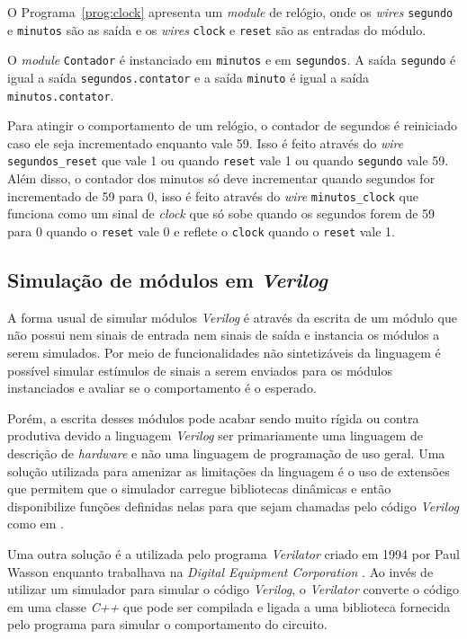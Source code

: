 O Programa~\ref{prog:clock} apresenta um \emph{module} de relógio,
onde os \emph{wires} \texttt{segundo} e \texttt{minutos} são as 
saída e os \emph{wires} \texttt{clock} e \texttt{reset} são as entradas 
do módulo.

O \emph{module} \texttt{Contador} é instanciado em \texttt{minutos}
e em \texttt{segundos}. A saída \texttt{segundo} é igual a saída 
\texttt{segundos.contator} e a saída \texttt{minuto} é igual a saída 
\texttt{minutos.contator}.

Para atingir o comportamento de um relógio, o contador de segundos é
reiniciado caso ele seja incrementado enquanto vale 59. Isso é feito
através do \emph{wire} \texttt{segundos\_reset} que vale 1 ou quando
\texttt{reset} vale 1 ou quando \texttt{segundo} vale 59.
Além disso, o contador dos minutos só deve incrementar quando segundos
for incrementado de 59 para 0, isso é feito através do \emph{wire}
\texttt{minutos\_clock} que funciona como um sinal de \emph{clock} que só
sobe quando os segundos forem de 59 para 0 quando o \texttt{reset} vale 0
e reflete o \texttt{clock} quando o \texttt{reset} vale 1.

\subsection{Simulação de módulos em \emph{Verilog}}
\label{sec:vesim}

A forma usual de simular módulos \emph{Verilog} é através
da escrita de um módulo que não possui nem sinais de entrada
nem sinais de saída e instancia os módulos a serem simulados. Por meio
de funcionalidades não sintetizáveis da linguagem é possível
simular estímulos de sinais a serem enviados para os módulos 
instanciados e avaliar se o comportamento é o esperado.

Porém, a escrita desses módulos pode acabar sendo muito 
rígida ou contra produtiva devido a linguagem \emph{Verilog} ser primariamente
uma linguagem de descrição de \emph{hardware} e não uma linguagem de
programação de uso geral. Uma solução utilizada para amenizar as 
limitações da linguagem é o uso de extensões que permitem que o simulador 
carregue bibliotecas dinâmicas e então disponibilize funções 
definidas nelas para que sejam chamadas
pelo código \emph{Verilog} como em \cite{VPI}.

Uma outra solução é a utilizada pelo programa \emph{Verilator} criado
em 1994 por Paul Wasson enquanto trabalhava na \emph{Digital Equipment Corporation}
\citep{Veri}. Ao invés de utilizar um simulador para simular o código \emph{Verilog},
o \emph{Verilator} converte o código em uma classe \emph{C++} que pode ser compilada e 
ligada a uma biblioteca fornecida pelo programa para simular o comportamento do circuito.

